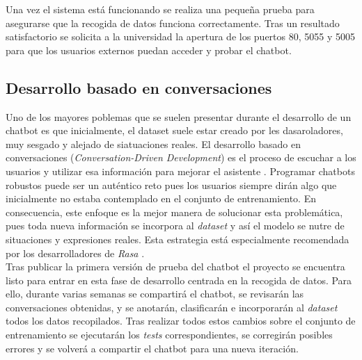Una vez el sistema está funcionando se realiza una pequeña prueba para asegurarse que la recogida de datos funciona correctamente. Tras un resultado satisfactorio se solicita a la universidad la apertura de los puertos 80, 5055 y 5005 para que los usuarios externos puedan acceder y probar el chatbot.\\


\subsection{Desarrollo basado en conversaciones}
\label{cdd}
Uno de los mayores poblemas que se suelen presentar durante el desarrollo de un chatbot es que inicialmente, el dataset suele estar creado por les dasaroladores, muy sesgado y alejado de siatuaciones reales. El desarrollo basado en conversaciones (\textit{Conversation-Driven Development}) es el proceso de escuchar a los usuarios y utilizar esa información para mejorar el asistente \cite{conversationDriven}. Programar chatbots robustos puede ser un auténtico reto pues los usuarios siempre dirán algo que inicialmente no estaba contemplado en el conjunto de entrenamiento. En consecuencia, este enfoque es la mejor manera de solucionar esta problemática, pues toda nueva información se incorpora al \textit{dataset} y así el modelo se nutre de situaciones y expresiones reales. Esta estrategia está especialmente recomendada por los desarrolladores de \textit{Rasa} \cite{bestPracticesNLU}.\\

Tras publicar la primera versión de prueba del chatbot el proyecto se encuentra listo para entrar en esta fase de desarrollo centrada en la recogida de datos. Para ello, durante varias semanas se compartirá el chatbot, se revisarán las conversaciones obtenidas, y se anotarán, clasificarán e incorporarán al \textit{dataset} todos los datos recopilados. Tras realizar todos estos cambios sobre el conjunto de entrenamiento se ejecutarán los \textit{tests} correspondientes, se corregirán posibles errores y se volverá a compartir el chatbot para una nueva iteración.\\

